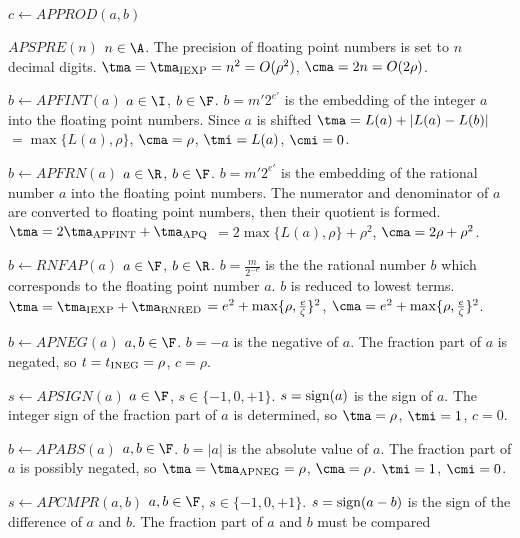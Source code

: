 \begin{deflist}{$c \gets APPROD(a,b)$}
\item[$APSPRE(n)$] $n \in \A$. 
     The precision of floating point numbers is set to
     $n$ decimal digits.
     $\tma = \tma_{{\rm IEXP}} = n^2 = O(\rho^2)$, 
     $\cma = 2 n = O(2 \rho)$. 
\item[$b \gets APFINT(a)$] $a \in \I$, $b \in \F$. 
     $b = m' 2^{e'}$ is the embedding of 
     the integer $a$ into the floating point numbers. 
     Since $a$ is shifted 
     $\tma = L(a) + \vert L(a) - L(b) \vert$ 
     $ = \max \{ L(a), \rho \}$,
     $\cma = \rho$, $\tmi = L(a)$, $\cmi = 0$.
\item[$b \gets APFRN(a)$] $a \in \R$, $b \in \F$. 
     $b = m' 2^{e'}$ is the embedding of 
     the rational number $a$ into the floating point numbers. 
     The numerator and denominator of $a$ are converted 
     to floating point numbers, then their quotient is formed.
     $\tma = 2 \tma_{{\rm APFINT}} + \tma_{{\rm APQ}}$ 
     $= 2 \max \{ L(a), \rho \} + \rho^2$, 
     $\cma = 2 \rho + \rho^2$. 
\item[$b \gets RNFAP(a)$] $a \in \F$, $b \in \R$. 
     $b = \frac{m}{2^{-e}}$ is the  
     the rational number $b$ which corresponds to 
     the floating point number $a$. 
     $b$ is reduced to lowest terms.
     $\tma = \tma_{{\rm IEXP}} + \tma_{{\rm RNRED}}$ 
     $= e^2 + {\rm max}\{ \rho, \frac{e}{\zeta} \}^2$, 
     $\cma = e^2 + {\rm max}\{ \rho, \frac{e}{\zeta} \}^2$. 
\item[$b \gets APNEG(a)$] $a, b \in \F$. 
     $b = -a$ is the negative of $a$.
     The fraction part of $a$ is negated, so 
     $t = t_{{\rm INEG}} = \rho$, $c = \rho$. 
\item[$s \gets APSIGN(a)$] $a \in \F$, $s \in \{-1,0,+1\}$. 
     $s = {\rm sign}(a)$ is the sign of $a$.
     The integer sign of the fraction part of $a$ is determined, so
     $\tma = \rho$, $\tmi = 1$, $c = 0$. 
\item[$b \gets APABS(a)$] $a, b \in \F$. 
     $b = \vert a \vert$ is the absolute value of $a$.
     The fraction part of $a$ is possibly negated, so 
     $\tma = \tma_{{\rm APNEG}} = \rho$, $\cma = \rho$. 
     $\tmi = 1$, $\cmi = 0$. 
\item[$s \gets APCMPR(a,b)$] $a, b \in \F$, $s \in \{-1,0,+1\}$. 
     $s = {\rm sign}(a-b)$ is the sign of the difference of 
     $a$ and $b$.
     The fraction part of $a$ and $b$ must be compared

\end{deflist}
